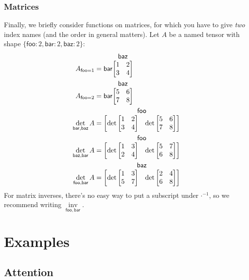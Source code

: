 \documentclass{article}
\makeatletter
\newcommand{\name}[1]{\mathsf{#1}}
\newcommand{\nidx}[2]{\name{#1}=#2}
\newcommand{\nset}[2]{\name{#1}:#2}
\newcommand{\nfun}[2]{\mathop{\text{#2}}\limits_{\name{#1}}}
\newcommand{\nmatrix}[3]{\name{#1}\begin{array}[b]{@{}c@{}}\name{#2}\\\begin{bmatrix}#3\end{bmatrix}\end{array}}
\makeatother
\begin{document}
\subsubsection{Matrices}

Finally, we briefly consider functions on matrices, for which you have to give \emph{two} index names (and the order in general matters). Let $A$ be a named tensor with shape $\{\nset{foo}{2},\nset{bar}{2},\nset{baz}{2\}}$:
\begin{align*}
A_{\nidx{foo}{1}} &= \nmatrix{bar}{baz}{
  1 & 2 \\
  3 & 4
} \\
A_{\nidx{foo}{2}} &= \nmatrix{bar}{baz}{
  5 & 6 \\
  7 & 8
} \\
\nfun{bar,baz}{det} A &= \nmatrix{}{foo}{\det \begin{bmatrix} 1 & 2 \\ 3 & 4 \end{bmatrix} & \det \begin{bmatrix} 5 & 6 \\ 7 & 8 \end{bmatrix}} \\
\nfun{baz,bar}{det} A &= \nmatrix{}{foo}{\det \begin{bmatrix} 1 & 3 \\ 2 & 4 \end{bmatrix} & \det \begin{bmatrix} 5 & 7 \\ 6 & 8 \end{bmatrix}} \\
\nfun{foo,bar}{det} A &= \nmatrix{}{baz}{\det \begin{bmatrix} 1 & 3 \\ 5 & 7 \end{bmatrix} & \det \begin{bmatrix} 2 & 4 \\ 6 & 8 \end{bmatrix}}
\end{align*}
For matrix inverses, there's no easy way to put a subscript under $\mathord\cdot^{-1}$, so we recommend writing $\nfun{foo,bar}{inv}$.

\section{Examples}
\label{sec:examples}

\subsection{Attention}
\end{document}
